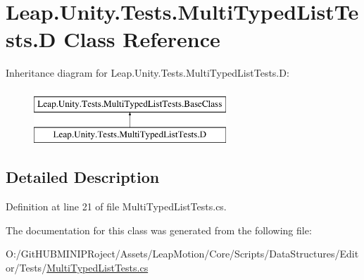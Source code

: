 \hypertarget{class_leap_1_1_unity_1_1_tests_1_1_multi_typed_list_tests_1_1_d}{}\section{Leap.\+Unity.\+Tests.\+Multi\+Typed\+List\+Tests.\+D Class Reference}
\label{class_leap_1_1_unity_1_1_tests_1_1_multi_typed_list_tests_1_1_d}
Inheritance diagram for Leap.\+Unity.\+Tests.\+Multi\+Typed\+List\+Tests.\+D\+:\begin{figure}[H]
\begin{center}
\leavevmode
\includegraphics[height=2.000000cm]{class_leap_1_1_unity_1_1_tests_1_1_multi_typed_list_tests_1_1_d}
\end{center}
\end{figure}


\subsection{Detailed Description}


Definition at line 21 of file Multi\+Typed\+List\+Tests.\+cs.



The documentation for this class was generated from the following file\+:\begin{DoxyCompactItemize}
\item 
O\+:/\+Git\+H\+U\+B\+M\+I\+N\+I\+P\+Roject/\+Assets/\+Leap\+Motion/\+Core/\+Scripts/\+Data\+Structures/\+Editor/\+Tests/\mbox{\hyperlink{_multi_typed_list_tests_8cs}{Multi\+Typed\+List\+Tests.\+cs}}\end{DoxyCompactItemize}
